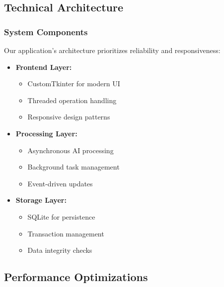 \documentclass[12pt]{article}
\begin{document}
\subsection{Technical Architecture}

\subsubsection{System Components}
Our application's architecture prioritizes reliability and responsiveness:
\begin{itemize}
    \item \textbf{Frontend Layer:}
    \begin{itemize}
        \item CustomTkinter for modern UI
        \item Threaded operation handling
        \item Responsive design patterns
    \end{itemize}
    
    \item \textbf{Processing Layer:}
    \begin{itemize}
        \item Asynchronous AI processing
        \item Background task management
        \item Event-driven updates
    \end{itemize}
    
    \item \textbf{Storage Layer:}
    \begin{itemize}
        \item SQLite for persistence
        \item Transaction management
        \item Data integrity checks
    \end{itemize}
\end{itemize}

\subsection{Performance Optimizations}
\end{document}
